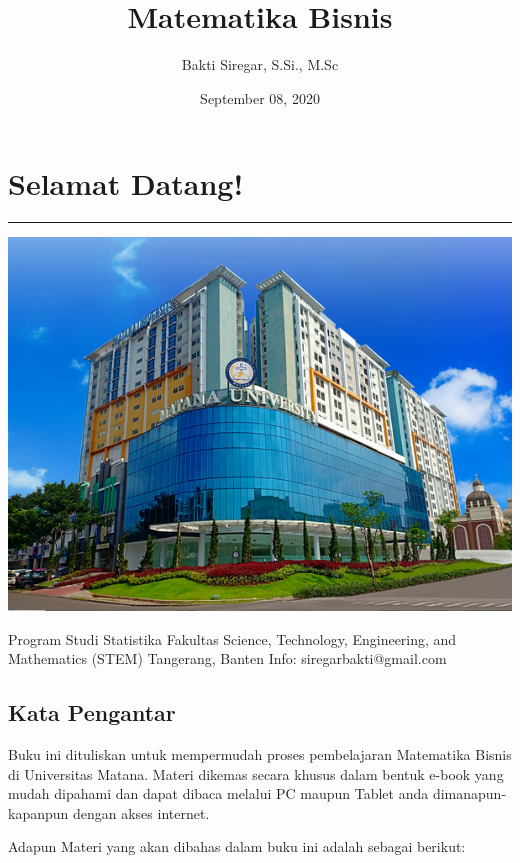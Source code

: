 \documentclass[
]{book}
\title{Matematika Bisnis}
\author{Bakti Siregar, S.Si., M.Sc}
\date{September 08, 2020}
\begin{document}
\maketitle

{
\setcounter{tocdepth}{1}
\tableofcontents
}
\hypertarget{selamat-datang}{%
\chapter*{Selamat Datang!}\label{selamat-datang}}

\begin{center}\rule{0.5\linewidth}{0.5pt}\end{center}

\begin{center}\includegraphics[width=0.5\linewidth]{images/cover} \end{center}

Program Studi Statistika
Fakultas Science, Technology, Engineering, and Mathematics (STEM)
Tangerang, Banten
Info: siregarbakti@gmail.com

\hypertarget{kata-pengantar}{%
\section*{Kata Pengantar}\label{kata-pengantar}}

Buku ini dituliskan untuk mempermudah proses pembelajaran Matematika Bisnis di Universitas Matana. Materi dikemas secara khusus dalam bentuk e-book yang mudah dipahami dan dapat dibaca melalui PC maupun Tablet anda dimanapun-kapanpun dengan akses internet.

Adapun Materi yang akan dibahas dalam buku ini adalah sebagai berikut:
\end{document}
